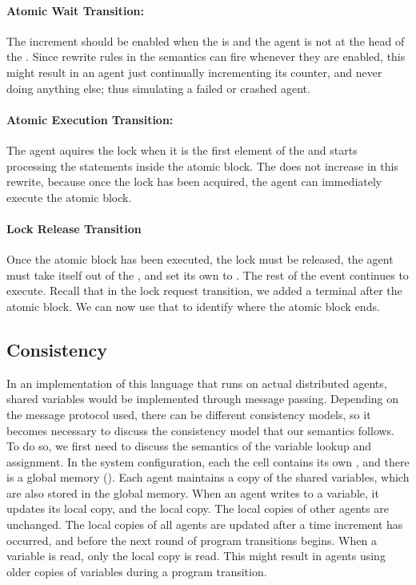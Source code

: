 
\paragraph{Atomic Wait Transition:} The  increment should be enabled when the  is  and the agent  is not at the head of the . Since rewrite rules in the semantics can fire whenever they are enabled, this might result in an agent just continually incrementing its counter, and never doing anything else; thus simulating a failed or crashed agent. 

\paragraph{Atomic Execution Transition:} The agent aquires the lock when it is the first element of the  and starts processing the statements inside the atomic block. The  does not increase in this rewrite, because once the lock has been acquired, the agent can immediately execute the atomic block. 

\paragraph{Lock Release Transition}
Once the atomic block has been executed, the lock must be released, the agent must take itself out of the , and set its own  to . The rest of the event continues to execute. Recall that in the lock request transition, we added a terminal  after the atomic block. We can now use that to identify where the atomic block ends. 


\subsection{Consistency}
In an implementation of this language that runs on actual distributed agents, shared variables would be implemented through message passing. Depending on the message protocol used, there can be different consistency models, so it becomes necessary to discuss the consistency model that our semantics follows. To do so, we first need to discuss the semantics  of the variable lookup and assignment. In the system configuration, each the  cell contains its own , and there is a global memory (). Each agent maintains a copy of the shared variables, which are also stored in the global memory. When an agent writes to a variable, it updates its local copy, and the local copy. The local copies of other agents are unchanged. The local copies of all agents are updated after a time increment has occurred, and before the next round of program transitions begins. When a variable is read, only the local copy is read. This might result in agents using older copies of variables during a program transition. 

